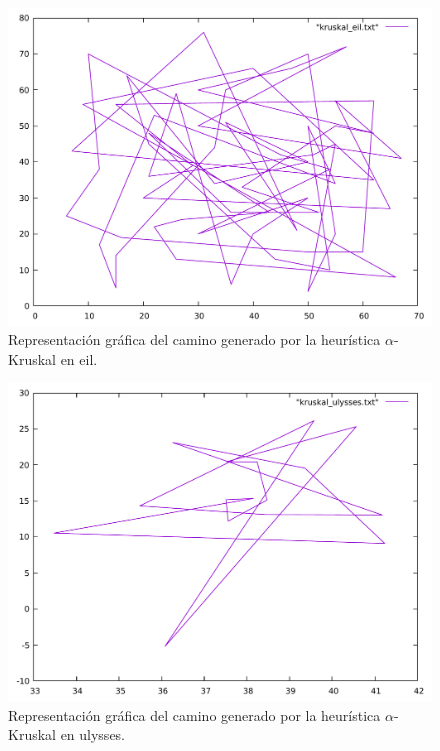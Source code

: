 \begin{figure}[H]
  \centering
  \includegraphics[scale=0.5]{../src/kruskal_eil.pdf}
  \caption{Representación gráfica del camino generado por la heurística $\alpha$-Kruskal en eil.}
\end{figure} 

\begin{figure}[H]
  \centering
  \includegraphics[scale=0.5]{../src/kruskal_ulysses.pdf}
  \caption{Representación gráfica del camino generado por la heurística $\alpha$-Kruskal en ulysses.}
\end{figure} 